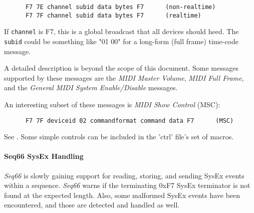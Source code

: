    \begin{verbatim}
      F7 7E channel subid data bytes F7      (non-realtime)
      F7 7F channel subid data bytes F7      (realtime)
   \end{verbatim}

   If \texttt{channel} is F7, this is a global broadcast that all devices
   should heed.
   The \texttt{subid} could be something like "01 00" for a long-form
   (full frame) time-code message.


   A detailed description is beyond the scope of this document.
   Some messages supported by these messages are the
   \textsl{MIDI Master Volume},
   \textsl{MIDI Full Frame},
   and the \textsl{General MIDI System Enable/Disable}
   messages.

   An interesting subset of these messages is \textsl{MIDI Show Control}
   (MSC):

   \begin{verbatim}
      F7 7F deviceid 02 commandformat command data F7      (MSC)
   \end{verbatim}

   See \cite{msc}.
   Some simple controls can be included in the 'ctrl' file's set of macros.

\paragraph{Seq66 SysEx Handling}
\label{paragraph:midi_format_seq66_sysex_handling}

   \textsl{Seq66} is slowly gaining support for reading, storing, and
   sending SysEx events within a sequence.
   \textsl{Seq66} warns if the
   terminating 0xF7 SysEx terminator is not found at the expected length.
   Also, some malformed SysEx events have been encountered, and those are
   detected and handled as well.

